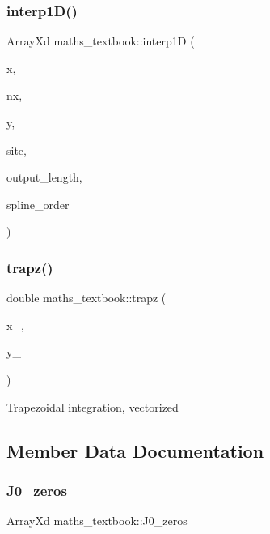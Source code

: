 \subsubsection{\texorpdfstring{interp1D()}{interp1D()}\hspace{0.1cm}{\footnotesize\ttfamily [2/2]}}
{\footnotesize\ttfamily Array\+Xd maths\+\_\+textbook\+::interp1D (\begin{DoxyParamCaption}\item[{Array\+Xd}]{x,  }\item[{int}]{nx,  }\item[{Array\+Xd}]{y,  }\item[{Array\+Xd}]{site,  }\item[{int}]{output\+\_\+length,  }\item[{int}]{spline\+\_\+order }\end{DoxyParamCaption})}

\mbox{\label{classmaths__textbook_a158ce9c89ee1db5495810c25ee2aed57}} 
\subsubsection{\texorpdfstring{trapz()}{trapz()}}
{\footnotesize\ttfamily double maths\+\_\+textbook\+::trapz (\begin{DoxyParamCaption}\item[{Array\+Xd}]{x\+\_\+,  }\item[{Array\+Xd}]{y\+\_\+ }\end{DoxyParamCaption})}

Trapezoidal integration, vectorized 

\subsection{Member Data Documentation}
\mbox{\label{classmaths__textbook_a41398eada5e3eb88fb64d044c14aed26}} 
\subsubsection{\texorpdfstring{J0\_zeros}{J0\_zeros}}
{\footnotesize\ttfamily Array\+Xd maths\+\_\+textbook\+::\+J0\+\_\+zeros}

